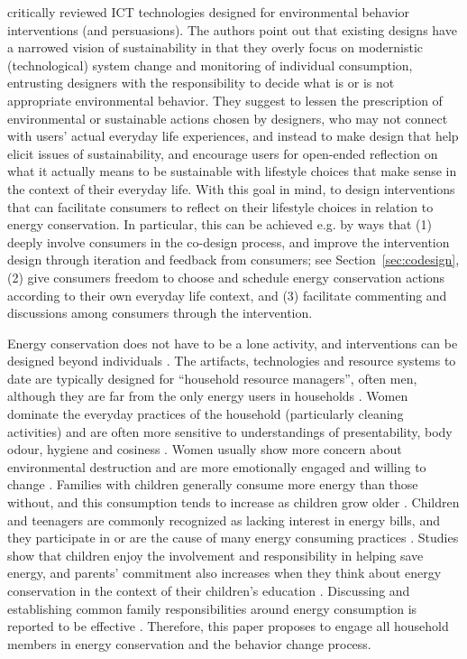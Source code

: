 \documentclass[a4paper]{article}
\begin{document}
\citet{Brynjarsdottir2012} critically reviewed ICT technologies designed for environmental behavior interventions (and persuasions). The authors point out that existing designs have a narrowed vision of sustainability in that they overly focus on modernistic (technological) system change and monitoring of individual consumption, entrusting designers with the responsibility to decide what is or is not appropriate environmental behavior. They suggest to lessen the prescription of environmental or sustainable actions chosen by designers, who may not connect with users' actual everyday life experiences, and instead to make design that help elicit issues of sustainability, and encourage users for open-ended reflection on what it actually means to be sustainable with lifestyle choices that make sense in the context of their everyday life. With this goal in mind, to design interventions that can facilitate consumers to reflect on their lifestyle choices in relation to energy conservation. In particular, this can be achieved e.g. by ways that (1) deeply involve consumers in the co-design process, and improve the intervention design through iteration and feedback from consumers; see Section~\ref{sec:codesign}, (2) give consumers freedom to choose and schedule energy conservation actions according to their own everyday life context, and (3) facilitate commenting and discussions among consumers through the intervention.

Energy conservation does not have to be a lone activity, and interventions can be designed beyond individuals \citep{Petkov2011,Brynjarsdottir2012}. The artifacts, technologies and resource systems to date are typically designed for ``household resource managers'', often men, although they are far from the only energy users in households \citep{Strengers2014}. Women dominate the everyday practices of the household (particularly cleaning activities) and are often more sensitive to understandings of presentability, body odour, hygiene and cosiness \citep{Strengers2014}. Women usually show more concern about environmental destruction and are more emotionally engaged and willing to change \citep{Kollmuss2002}. Families with children generally consume more energy than those without, and this consumption tends to increase as children grow older \citep{Fell2014}. Children and teenagers are commonly recognized as lacking interest in energy bills, and they participate in or are the cause of many energy consuming practices \citep{Berthou2013,Strengers2014}. Studies show that children enjoy the involvement and responsibility in helping save energy, and parents' commitment also increases when they think about energy conservation in the context of their children's education \citep{Burchell2014,Fell2014}. Discussing and establishing common family responsibilities around energy consumption is reported to be effective \citep{huizenga2015shedding}. Therefore, this paper proposes to engage all household members in energy conservation and the behavior change process. 
\end{document}
